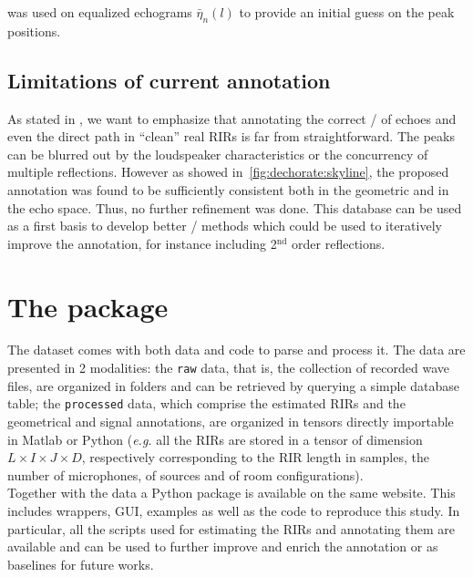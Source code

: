  was used on equalized echograms $\bar{\eta}_{n}(l)$ to provide an initial guess on the peak positions.

\subsection{Limitations of current annotation}
As stated in , we want to emphasize that annotating the correct \TOAs/ of echoes and even the direct path in ``clean'' real \acp{RIR} is far from straightforward.
The peaks can be blurred out by the loudspeaker characteristics or the concurrency of multiple reflections.
However as showed in~\cref{fig:dechorate:skyline}, the proposed annotation was found to be sufficiently consistent both in the geometric and in the echo space.
Thus, no further refinement was done.
This database can be used as a first basis to develop better \AER/ methods which could be used to iteratively improve the annotation, for instance including  2$^\text{nd}$ order reflections.

\section{The  package}
The dataset comes with both data and code to parse and process it.
The data are presented in 2 modalities: the \texttt{raw} data, that is, the collection of recorded wave files, are organized in folders and can be retrieved by querying a simple database table; the \texttt{processed} data, which comprise the estimated \acp{RIR} and the geometrical and signal annotations, are organized in tensors directly importable in Matlab or Python (\textit{e.g.} all the \acp{RIR} are stored in a tensor of dimension $L \times I \times J \times D$, respectively corresponding to the RIR length in samples, the number of microphones, of sources and of room configurations).
\\Together with the data a Python package is available on the same website.
This includes wrappers, GUI, examples as well as the code to reproduce this study.
In particular, all the scripts used for estimating the \acp{RIR} and annotating them are available and can be used to further improve and enrich the annotation or as baselines for future works.

